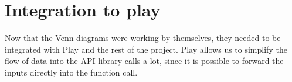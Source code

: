 \section{Integration to play}
Now that the Venn diagrams were working by themselves, they needed to be integrated with Play and the rest of the project. Play allows us to simplify the flow of data into the API library calls a lot, since it is possible to forward the inputs directly into the function call.
